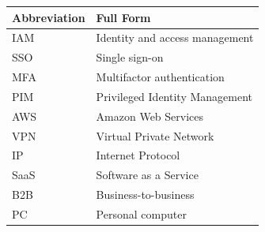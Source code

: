\documentclass[10pt]{article}
\begin{document}
\begin{center}
\begin{tabular}{>{\raggedright\arraybackslash}p{} >{\raggedright\arraybackslash}p{}}
\toprule
\textbf{Abbreviation} & \textbf{Full Form} \\
\midrule
IAM & Identity and access management \\
SSO & Single sign-on \\
MFA & Multifactor authentication \\
PIM & Privileged Identity Management \\
AWS & Amazon Web Services \\
VPN & Virtual Private Network \\
IP & Internet Protocol \\
SaaS & Software as a Service \\
B2B & Business-to-business \\
PC & Personal computer \\
\bottomrule
\end{tabular}
\end{center}
\end{document}
